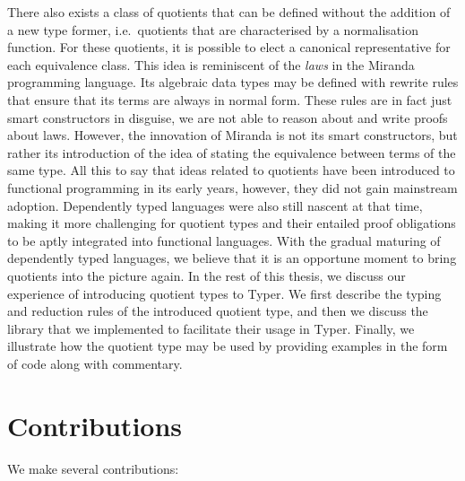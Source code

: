 \documentclass[12pt,twoside,maitrise]{dms}
\theoremstyle{definition}
\numberwithin{equation}{section}
\numberwithin{table}{chapter}
\numberwithin{figure}{chapter}
\begin{document}
There also exists a class of quotients that can be defined without the addition
of a new type former, i.e.\ quotients that are characterised by a normalisation
function\cite{li2015quotient,courtieu-normalizedtypes}. For these quotients, it
is possible to elect a canonical representative for each equivalence class. This
idea is reminiscent of the \emph{laws} in the Miranda programming
language\cite{thompson1986laws}. Its algebraic data types may be defined with
rewrite rules that ensure that its terms are always in normal form. These rules
are in fact just smart constructors\cite{adams1993functional} in disguise, we
are not able to reason about and write proofs about laws. However, the
innovation of Miranda is not its smart constructors, but rather its introduction
of the idea of stating the equivalence between terms of the same type. All this
to say that ideas related to quotients have been introduced to functional
programming in its early years, however, they did not gain mainstream adoption.
Dependently typed languages were also still nascent at that time, making it more
challenging for quotient types and their entailed proof obligations to be aptly
integrated into functional languages. With the gradual maturing of dependently
typed languages, we believe that it is an opportune moment to bring quotients
into the picture again. In the rest of this thesis, we discuss our experience of
introducing quotient types to Typer. We first describe the typing and reduction
rules of the introduced quotient type, and then we discuss the library that we
implemented to facilitate their usage in Typer. Finally, we illustrate how the
quotient type may be used by providing examples in the form of code along with
commentary.

\section{Contributions}

We make several contributions:
\end{document}
